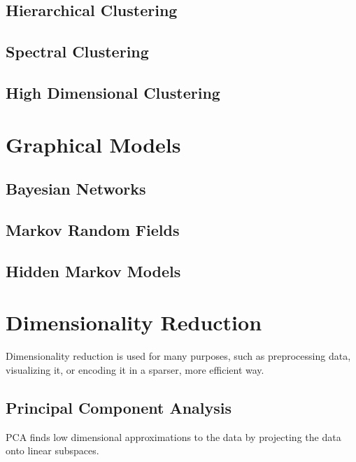 \documentclass{article}
\begin{document}
  \subsection{Hierarchical Clustering} 

  \subsection{Spectral Clustering}

  \subsection{High Dimensional Clustering}

\section{Graphical Models} 

  \subsection{Bayesian Networks} 

  \subsection{Markov Random Fields}

  \subsection{Hidden Markov Models}

\section{Dimensionality Reduction} 

  Dimensionality reduction is used for many purposes, such as preprocessing data, visualizing it, or encoding it in a sparser, more efficient way. 

  \subsection{Principal Component Analysis} 
    
    PCA finds low dimensional approximations to the data by projecting the data onto linear subspaces. 
\end{document}
